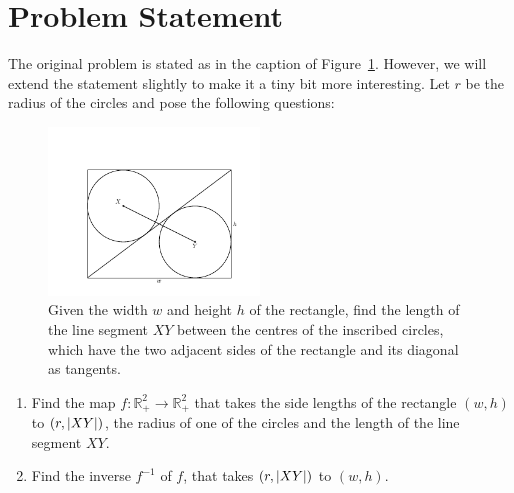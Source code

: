 \section{Problem Statement}
\label{sec:statement}


The original problem is stated as in the caption of Figure~\ref{fig:problem}.
However, we will extend the statement slightly to make it a tiny bit more
interesting.  Let $r$ be the radius of the circles and pose the following
questions:

\begin{figure}[h]
  \centering
  \includegraphics[trim={0 0 0 1.2cm},clip,width=0.5\textwidth]{./figures/basic1.pdf}
  \vspace{-8mm}
  \caption{Given the width $w$ and height $h$ of the rectangle, find the length
  of the line segment $XY$ between the centres of the inscribed circles, which
  have the two adjacent sides of the rectangle and its diagonal as tangents.}
  \label{fig:problem}
\end{figure}

\begin{enumerate}
  \setlength\itemsep{0em}
  \item Find the map $f: \mathbb{R}_+^2 \rightarrow \mathbb{R}_+^2$ that takes
          the side lengths of the rectangle $(w,h)$ to $(r, \left|{XY}\right|)$, the
          radius of one of the circles and the length of the line segment $XY$.
  \item Find the inverse $f^{-1}$ of $f$, that takes $(r, \left|{XY}\right|)$ to $(w,h)$.
\end{enumerate}

